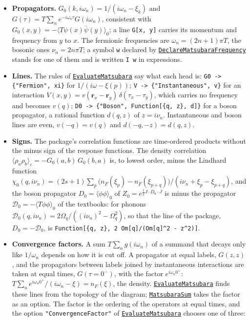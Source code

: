 \documentclass[11pt,a4paper]{article}
\newcommand{\pkg}[1]{\texttt{#1}}
\newcommand{\fnref}[1]{\hyperref[fn:#1]{\pkg{#1}}}
\newcommand{\opt}[1]{\texttt{"#1"}}
\begin{document}
\begin{itemize}
\item \textbf{Propagators.} $G_0(k,i\omega_n)=1/(i\omega_n-\xi_k)$ and $G(\tau)=T\sum_ne^{-i\omega_n\tau}G(i\omega_n)$, consistent with
  $G_0(x,y)=-\langle T\psi(x)\bar\psi(y)\rangle_0$; a line \pkg{G[x, y]} carries its momentum and frequency from $y$ to $x$.
  The fermionic frequencies are $\omega_n=(2n+1)\pi T$, the bosonic ones $\nu_n=2n\pi T$; a symbol \pkg{w} declared by
  \fnref{DeclareMatsubaraFrequency} stands for one of them and is written \pkg{I w} in expressions.
\item \textbf{Lines.} The rules of \fnref{EvaluateMatsubara} say what each head is: \pkg{G0 -> \{"Fermion", xi\}} for
  $1/(i\omega-\xi(p))$; \pkg{V -> \{"Instantaneous", v\}} for an interaction $V(x,y)=v(\mathbf r_x-\mathbf r_y)\,\delta(\tau_x-\tau_y)$,
  which carries no frequency and becomes $v(q)$; \pkg{D0 -> \{"Boson", Function[\{q, z\}, d]\}} for a boson propagator, a
  rational function $d(q,z)$ of $z=i\nu_n$. Instantaneous and boson lines are even, $v(-q)=v(q)$ and $d(-q,-z)=d(q,z)$.
\item \textbf{Signs.} The package's correlation functions are time-ordered products without the minus sign of the
  response functions. The density correlation $\langle\rho_a\rho_b\rangle_c=-G_0(a,b)\,G_0(b,a)$ is, to lowest order, minus
  the Lindhard function~\cite{Lindhard1954}
  $\chi_0(q,i\nu_n)=(2s+1)\sum_p\bigl(n_F(\xi_p)-n_F(\xi_{p+q})\bigr)/(i\nu_n+\xi_p-\xi_{p+q})$, and the boson propagator
  $D_0=\langle\phi\phi\rangle_0$ of $Z_0=e^{\frac12J\cdot D_0\cdot J}$ is minus the propagator
  $\mathcal D_0=-\langle T\phi\phi\rangle_0$ of the textbooks: for phonons~\cite{Mahan}
  $\mathcal D_0(q,i\nu_n)=2\Omega_q/((i\nu_n)^2-\Omega_q^2)$, so that the line of the package, $D_0=-\mathcal D_0$, is
  \pkg{Function[\{q, z\}, 2 Om[q]/(Om[q]\^{}2 - z\^{}2)]}.
\item \textbf{Convergence factors.} A sum $T\sum_n g(i\omega_n)$ of a summand that decays only like $1/\omega_n$ depends on
  how it is cut off. A propagator at equal labels, $G(z,z)$, and the propagators between labels joined by instantaneous
  interactions are taken at equal times, $G(\tau=0^-)$, with the factor $e^{i\omega_n0^+}$:
  $T\sum_ne^{i\omega_n0^+}/(i\omega_n-\xi)=n_F(\xi)$, the density. \fnref{EvaluateMatsubara} finds these lines from the
  topology of the diagram; \fnref{MatsubaraSum} takes the factor as an option. The factor is the ordering of the
  operators at equal times, and the option \opt{ConvergenceFactor} of \fnref{EvaluateMatsubara} chooses one of three:

\end{itemize}
\end{document}
